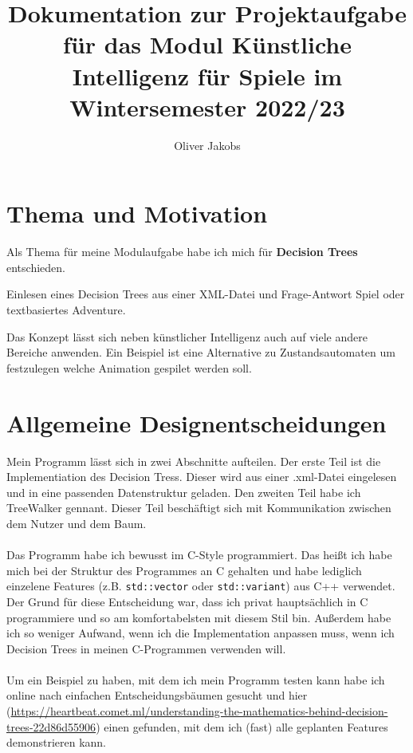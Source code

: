 \documentclass[a4paper,12pt]{article}
\title{Dokumentation zur Projektaufgabe für das Modul Künstliche Intelligenz für Spiele im Wintersemester 2022/23}
\author{Oliver Jakobs}
\begin{document}
\maketitle

\section*{Thema und Motivation}

Als Thema für meine Modulaufgabe habe ich mich für \textbf{Decision Trees} entschieden. 

Einlesen eines Decision Trees aus einer XML-Datei und Frage-Antwort Spiel oder textbasiertes Adventure.

Das Konzept lässt sich neben künstlicher Intelligenz auch auf viele andere Bereiche anwenden. Ein Beispiel ist eine Alternative zu Zustandsautomaten um festzulegen welche Animation gespilet werden soll.

\newpage

\section*{Allgemeine Designentscheidungen}

Mein Programm lässt sich in zwei Abschnitte aufteilen. Der erste Teil ist die Implementiation des Decision Tress. Dieser wird aus einer .xml-Datei eingelesen und in eine passenden Datenstruktur geladen. 
Den zweiten Teil habe ich TreeWalker gennant. Dieser Teil beschäftigt sich mit Kommunikation zwischen dem Nutzer und dem Baum. 
\\
\\
Das Programm habe ich bewusst im C-Style programmiert. Das heißt ich habe mich bei der Struktur des Programmes an C gehalten und habe lediglich einzelene Features (z.B. \texttt{std::vector} oder \texttt{std::variant}) aus C++ verwendet.
Der Grund für diese Entscheidung war, dass ich privat hauptsächlich in C programmiere und so am komfortabelsten mit diesem Stil bin. Außerdem habe ich so weniger Aufwand, wenn ich die Implementation anpassen muss, wenn ich Decision Trees in meinen C-Programmen verwenden will.
\\
\\
Um ein Beispiel zu haben, mit dem ich mein Programm testen kann habe ich online nach einfachen Entscheidungsbäumen gesucht und hier (\url{https://heartbeat.comet.ml/understanding-the-mathematics-behind-decision-trees-22d86d55906}) einen gefunden, mit dem ich (fast) alle geplanten Features demonstrieren kann. 
\end{document}
